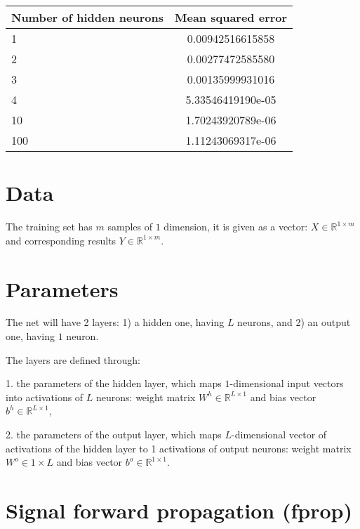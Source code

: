 \documentclass[]{article}
\theoremstyle{definition}
\begin{document}
\begin{table}
		\begin{center}
	\begin{tabular}{ | l | c | }
		\hline
		Number of hidden neurons & Mean squared error \\ \hline
		1 & 0.00942516615858  \\ \hline
		2 & 0.00277472585580  \\ \hline
		3 & 0.00135999931016  \\ \hline
		4 & 5.33546419190e-05  \\ \hline
		10 & 1.70243920789e-06  \\ \hline
		100 & 1.11243069317e-06  \\ \hline
		\hline
	\end{tabular}
		\end{center}
\end{table}



\newpage
\section{Data}

The training set has $m$ samples of $1$ dimension, it is given as a vector: $X \in \mathbb{R}^{1\times m}$ and corresponding results
$Y\in \mathbb{R}^{1\times m}$.

\section{Parameters}

The net will have 2 layers: 1) a hidden one, having $L$ neurons,
and 2) an output one, having $1$ neuron.

The layers are defined through:

1. the parameters of the hidden layer, which maps $1$-dimensional input vectors
into activations of $L$ neurons:
weight matrix $W^h\in\mathbb{R}^{L\times 1	}$ and bias vector
$b^h\in\mathbb{R}^{L\times 1}$,

2. the parameters of the output layer, which maps $L$-dimensional vector
of activations of the hidden layer to 1 activations of output neurons:
weight matrix $W^o\in{1\times L}$ and bias vector $b^o\in\mathbb{R}^{1\times 1}$.


\section{Signal forward propagation (fprop)}
\end{document}
